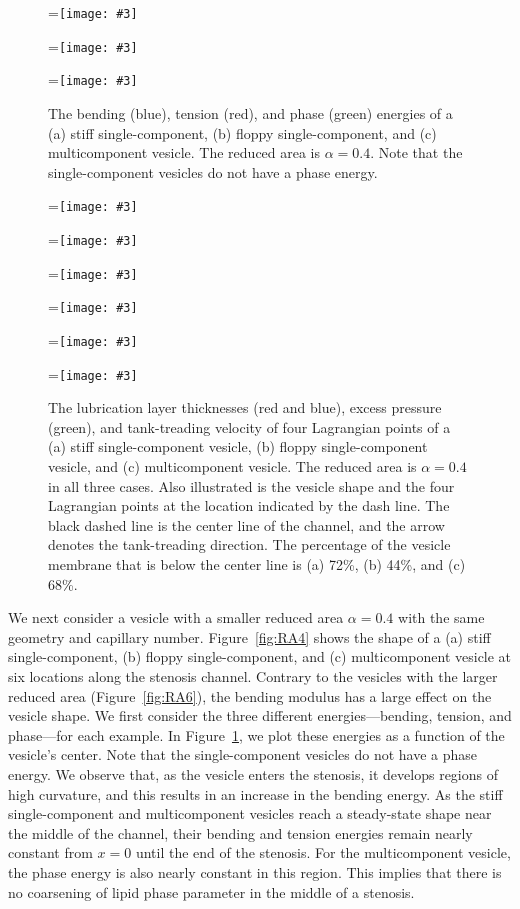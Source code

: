 \documentclass[twoside,twocolumn,9pt]{article}
\newcommand{\subfigimg}[3][,]{%
  \setbox1=\hbox{\texttt{[image: \#3]}}%
  \leavevmode\rlap{\usebox1}%
  \rlap{\hspace*{0pt}\raisebox{\dimexpr\ht1-0\baselineskip}{\bf
  \normalsize #2}}%
  \phantom{\usebox1}%
}
\begin{document}
\begin{figure}[ht]
  \centering
  \subfigimg[width=0.3\linewidth]{(a)}{figures/SC_energy.pdf}
  \subfigimg[width=0.3\linewidth]{(b)}{figures/SCp55_energy.pdf}
  \subfigimg[width=0.3\linewidth]{(c)}{figures/MCp5_energy.pdf}
  \caption{\label{fig:Energy} \small The bending (blue), tension (red),
  and phase (green) energies of a (a) stiff single-component, (b)
  floppy single-component, and (c) multicomponent vesicle. The reduced
  area is $\alpha = 0.4$. Note that the single-component vesicles do not
  have a phase energy.} 
\end{figure}
\begin{figure}[ht]
  \centering
  \subfigimg[width=0.3\linewidth]{(a)}{figures/Layer_Size_RAp4_SC.pdf}
  \subfigimg[width=0.3\linewidth]{(b)}{figures/Layer_Size_RAp4_SCp55.pdf}
  \subfigimg[width=0.3\linewidth]{(c)}{figures/Layer_Size_RAp4_MCp5.pdf}
  \subfigimg[width=0.3\linewidth,trim=0cm 6cm 28cm 0cm,clip=true]{}{figures/TankTreadingFigs_composite_SC.pdf}
  \subfigimg[width=0.3\linewidth,trim=0cm 6cm 28cm
  0cm,clip=true]{}{figures/TankTreadingFigs_composite_SCp55.pdf}
  \subfigimg[width=0.3\linewidth,trim=0cm 6cm 28cm
  0cm,clip=true]{}{figures/TankTreadingFigs_composite_MCp5.pdf}
  \caption{\label{fig:lubricationComposite} \small The lubrication layer
  thicknesses (red and blue), excess pressure (green), and
  tank-treading velocity of four Lagrangian points of a (a) stiff
  single-component vesicle, (b) floppy single-component vesicle, and (c)
  multicomponent vesicle. The reduced area is $\alpha = 0.4$ in all
  three cases. Also illustrated is the vesicle shape and the four
  Lagrangian points at the location indicated by the dash line. The
  black dashed line is the center line of the channel, and the arrow
  denotes the tank-treading direction. The percentage of the vesicle
  membrane that is below the center line is (a) 72\%, (b) 44\%, and (c)
  68\%.}
\end{figure}


We next consider a vesicle with a smaller reduced area $\alpha=0.4$ with
the same geometry and capillary number. Figure~\ref{fig:RA4} shows the
shape of a (a) stiff single-component, (b) floppy single-component, and
(c) multicomponent vesicle at six locations along the stenosis channel.
Contrary to the vesicles with the larger reduced area
(Figure~\ref{fig:RA6}), the bending modulus has a large effect on the
vesicle shape. We first consider the three different energies---bending,
tension, and phase---for each example. In Figure~\ref{fig:Energy}, we
plot these energies as a function of the vesicle's center. Note that the
single-component vesicles do not have a phase energy. We observe that,
as the vesicle enters the stenosis, it develops regions of high
curvature, and this results in an increase in the bending energy. As
the stiff single-component and multicomponent vesicles reach a
steady-state shape near the middle of the channel, their bending and
tension energies remain nearly constant from $x=0$ until the end of the
stenosis. For the multicomponent vesicle, the phase energy is also
nearly constant in this region. This implies that there is no coarsening
of lipid phase parameter in the middle of a stenosis.
\end{document}
